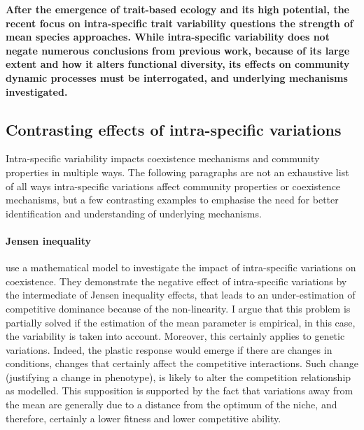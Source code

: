 {\textbf{After the emergence of trait-based ecology and its high potential, the recent focus on intra-specific trait variability questions the strength of mean species approaches. While  intra-specific variability  does not negate numerous conclusions from previous work, because of its large extent and how it alters functional diversity, its effects on community dynamic processes must be interrogated, and underlying mechanisms investigated.}

\subsection{Contrasting effects of intra-specific variations}

Intra-specific variability impacts coexistence mechanisms and community properties in multiple ways. The following paragraphs are not an exhaustive list of all ways intra-specific variations affect community properties or coexistence mechanisms, but a few contrasting examples to emphasise the need for better identification and understanding of underlying mechanisms. 

\paragraph{Jensen inequality}

\cite{hart_how_2016} use a mathematical model to investigate the impact of intra-specific variations on coexistence. They demonstrate the negative effect of intra-specific variations by the intermediate of Jensen inequality effects, that leads to an under-estimation of competitive dominance because of the non-linearity. I argue that this problem is partially solved if the estimation of the mean parameter is empirical, in this case, the variability is taken into account.
Moreover, this certainly applies to genetic variations. Indeed, the plastic response would emerge if there are changes in conditions, changes that certainly affect the competitive interactions. Such change (justifying a change in phenotype), is likely to alter the competition relationship as modelled. This supposition is supported by the fact that variations away from the mean are generally due to a distance from the optimum of the niche, and therefore, certainly a lower fitness and lower competitive ability. 


}
